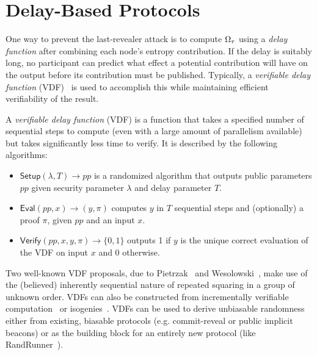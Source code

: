 
\section{Delay-Based Protocols}
\label{section:delay}
One way to prevent the last-revealer attack is to compute $\Omega_\tau$ using a \emph{delay function} after combining each node's entropy contribution. If the delay is suitably long, no participant can predict what effect a potential contribution will have on the output before its contribution must be published. Typically, a \emph{verifiable delay function} (VDF)~\cite{boneh2018verifiable,boneh2018survey} is used to accomplish this while maintaining efficient verifiability of the result.

\begin{definition}
A \textit{verifiable delay function} (VDF) is a function that takes a specified number of sequential steps to compute (even with a large amount of parallelism available) but takes significantly less time to verify. It is described by the following algorithms:
\begin{itemize}
\item $\mathsf{Setup}(\lambda, T) \rightarrow pp$ is a randomized algorithm that outputs public parameters $pp$ given security parameter $\lambda$ and delay parameter $T$.
\item $\mathsf{Eval}(pp, x) \rightarrow (y, \pi)$ computes $y$ in $T$ sequential steps and (optionally) a proof $\pi$, given $pp$ and an input $x$.
\item $\mathsf{Verify}(pp, x, y, \pi) \rightarrow \{0, 1\}$ outputs 1 if $y$ is the unique correct evaluation of the VDF on input $x$ and 0 otherwise.
\end{itemize}
\end{definition}

Two well-known VDF proposals, due to Pietrzak~\cite{pietrzak2018simple} and Wesolowski~\cite{wesolowski2019efficient}, make use of the (believed) inherently sequential nature of repeated squaring in a group of unknown order.
VDFs can also be constructed from incrementally verifiable computation~\cite{boneh2018verifiable,khovratovich2022minroot} or isogenies~\cite{de2019verifiable}.
VDFs can be used to derive unbiasable randomness either from existing, biasable protocols (e.g. commit-reveal or public implicit beacons) or as the building block for an entirely new protocol (like RandRunner~\cite{schindler2021randrunner}).

